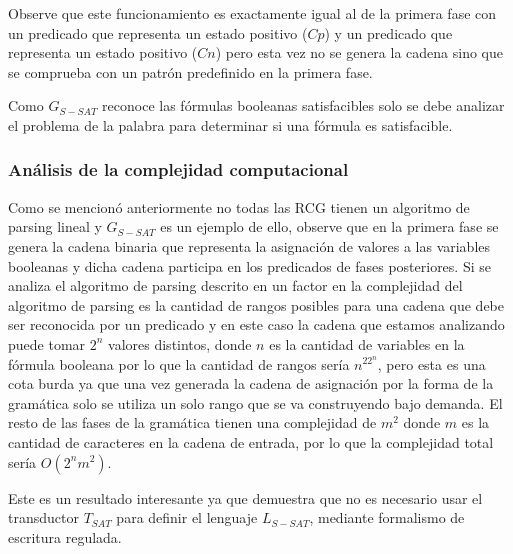 \documentclass[12pt]{article}
\begin{document}
\begin{itemize}
          Observe que este funcionamiento es exactamente igual al de la primera fase con un predicado que representa un estado
          positivo ($Cp$) y un predicado que representa un estado
          positivo ($Cn$) pero esta vez no se genera la cadena sino que se comprueba con un patrón predefinido en la primera
          fase.
          
          Como $G_{S-SAT}$ reconoce las fórmulas booleanas satisfacibles solo se debe analizar el problema de la
          palabra para determinar si una fórmula es satisfacible.
          
          
          
          \subsubsection{Análisis de la complejidad computacional}
          
          Como se mencionó anteriormente no todas las RCG tienen un algoritmo de parsing lineal y $G_{S-SAT}$ es un ejemplo de 
          ello, observe que en la primera fase se genera la cadena binaria que representa la asignación de valores a las variables
          booleanas y dicha cadena participa en los predicados de fases posteriores. Si se analiza el algoritmo de parsing descrito en 
          \cite{mainRCGBib} un factor en la complejidad del algoritmo de parsing es la cantidad de rangos posibles para una cadena 
          que debe ser reconocida por un predicado y en este caso la cadena que estamos analizando puede tomar $2^n$ valores distintos, donde
          $n$ es la cantidad de variables en la fórmula booleana por lo que la cantidad de rangos sería $n^22^n$, pero esta es una cota
          burda ya que una vez generada la cadena de asignación por la forma de la gramática solo se utiliza un solo rango que se va construyendo
          bajo demanda. El resto de las fases de la gramática tienen una complejidad de $m^2$ donde $m$ es la cantidad de caracteres
          en la cadena de entrada, por lo que la complejidad total sería $O(2^nm^2)$.
          
          Este es un resultado interesante ya que demuestra que no es necesario usar el transductor $T_{SAT}$ para definir el 
          lenguaje $L_{S-SAT}$, mediante formalismo de escritura regulada.
          
          
\end{itemize}
\end{document}
